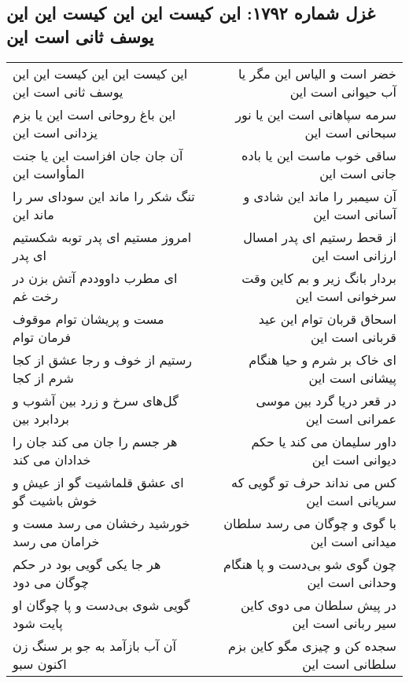 \begin{center}
\section*{غزل شماره ۱۷۹۲: این کیست این این کیست این این یوسف ثانی است این}
\label{sec:1792}
\begin{longtable}{l p{0.5cm} r}
این کیست این این کیست این این یوسف ثانی است این
&&
خضر است و الیاس این مگر یا آب حیوانی است این
\\
این باغ روحانی است این یا بزم یزدانی است این
&&
سرمه سپاهانی است این یا نور سبحانی است این
\\
آن جان جان افزاست این یا جنت المأواست این
&&
ساقی خوب ماست این یا باده جانی است این
\\
تنگ شکر را ماند این سودای سر را ماند این
&&
آن سیمبر را ماند این شادی و آسانی است این
\\
امروز مستیم ای پدر توبه شکستیم ای پدر
&&
از قحط رستیم ای پدر امسال ارزانی است این
\\
ای مطرب داووددم آتش بزن در رخت غم
&&
بردار بانگ زیر و بم کاین وقت سرخوانی است این
\\
مست و پریشان توام موقوف فرمان توام
&&
اسحاق قربان توام این عید قربانی است این
\\
رستیم از خوف و رجا عشق از کجا شرم از کجا
&&
ای خاک بر شرم و حیا هنگام پیشانی است این
\\
گل‌های سرخ و زرد بین آشوب و بردابرد بین
&&
در قعر دریا گرد بین موسی عمرانی است این
\\
هر جسم را جان می کند جان را خدادان می کند
&&
داور سلیمان می کند یا حکم دیوانی است این
\\
ای عشق قلماشیت گو از عیش و خوش باشیت گو
&&
کس می نداند حرف تو گویی که سریانی است این
\\
خورشید رخشان می رسد مست و خرامان می رسد
&&
با گوی و چوگان می رسد سلطان میدانی است این
\\
هر جا یکی گویی بود در حکم چوگان می دود
&&
چون گوی شو بی‌دست و پا هنگام وحدانی است این
\\
گویی شوی بی‌دست و پا چوگان او پایت شود
&&
در پیش سلطان می دوی کاین سیر ربانی است این
\\
آن آب بازآمد به جو بر سنگ زن اکنون سبو
&&
سجده کن و چیزی مگو کاین بزم سلطانی است این
\\
\end{longtable}
\end{center}
